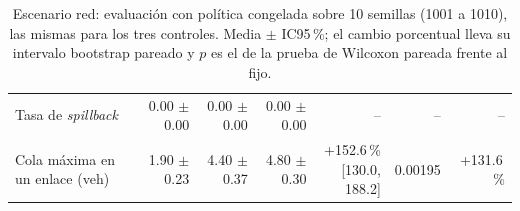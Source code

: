 \begin{table}[H]
\begin{tabular}{lrrrrrr}
Tasa de \textit{spillback} & 0.00 $\pm$ 0.00 & 0.00 $\pm$ 0.00 & 0.00 $\pm$ 0.00 & -- & -- & -- \\
Cola máxima en un enlace (veh) & 1.90 $\pm$ 0.23 & 4.40 $\pm$ 0.37 & 4.80 $\pm$ 0.30 & \makecell{+152.6\,\%\\{}[130.0, 188.2]} & 0.00195 & +131.6\,\% \\
\bottomrule
\end{tabular}
\caption[Escenario red: evaluación con política congelada]{Escenario red: evaluación con política congelada sobre 10 semillas (1001 a 1010), las mismas para los tres controles. Media $\pm$ IC95\,\%; el cambio porcentual lleva su intervalo bootstrap pareado y $p$ es el de la prueba de Wilcoxon pareada frente al fijo.}
\label{tab:red-evaluacion}
\end{table}
